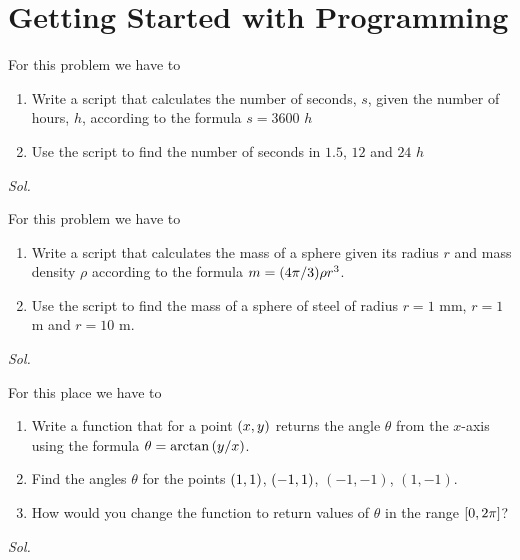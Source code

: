 \chapter{Getting Started with Programming}
    
    \begin{problem}[Seconds]\label{problem_2.1}
        For this problem we have to
        \begin{enumerate}
            \item Write a script that calculates the number of seconds, $s$, given the number of hours, $h$, according to the formula $s=3600$ $h$
            \item Use the script to find the number of seconds in $1.5$, $12$ and $24$ $h$
        \end{enumerate}
    \end{problem}
    \textit{ Sol. } 
    


    \begin{problem}\label{problem_2.2}
        For this problem we have to
        \begin{enumerate}
            \item Write a script that calculates the mass of a sphere given its radius $r$ and mass density $\rho$ according to the formula $m=\qty(4\pi/3)\rho r^{3}$.
            \item Use the script to find the mass of a sphere of steel of radius $r=1$ mm, $r=1$ m and $r=10$ m.
        \end{enumerate}
    \end{problem}
    \textit{ Sol. }
    

   
    \begin{problem}[Angle]\label{problem_2.3}
        For this place we have to
        \begin{enumerate}
            \item Write a function that for a point $\qty(x,y)$ returns the angle $\theta$ from the $x$-axis using the formula $\theta = \arctan{\qty(y/x)}$.
            \item Find the angles $\theta$ for the points $\qty(1,1)$, $\qty(-1,1)$, $(-1,-1)$, $(1,-1)$.
            \item How would you change the function to return values of $\theta$ in the range $\qty[0,2\pi]$?
        \end{enumerate}
    \end{problem}
    \textit{ Sol. }
    


